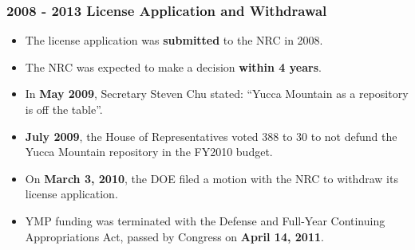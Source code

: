 \begin{frame}[ctb!]
    \frametitle{2008 - 2013 License Application and Withdrawal}
    \begin{itemize}
      \item The license application was \textbf{submitted} to the NRC in 2008.
      \item The NRC was expected to make a decision \textbf{within 4 years}.
      \item In \textbf{May 2009}, Secretary Steven Chu stated: ``Yucca Mountain as a 
        repository is off the table''.
      \item \textbf{July 2009}, the House of Representatives voted 388 to 30 to 
        not defund the Yucca Mountain repository in the FY2010 budget.
      \item On \textbf{March 3, 2010}, the DOE filed a motion with the NRC to 
        withdraw its license application. 
      \item YMP funding was terminated with the Defense and Full-Year Continuing 
        Appropriations Act, passed by Congress on \textbf{April 14, 2011}.
    \end{itemize}
  \end{frame}



